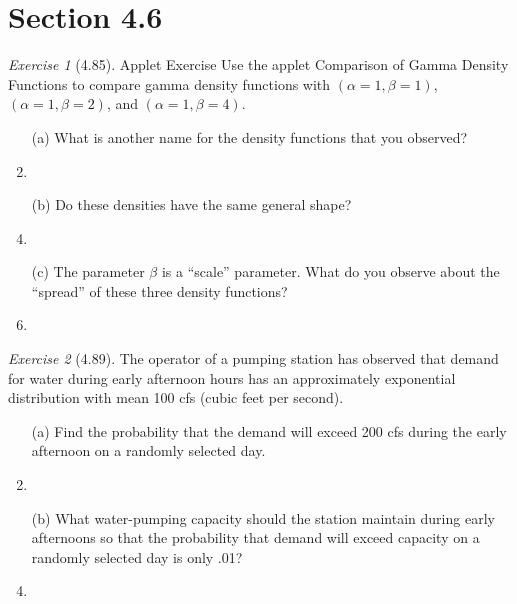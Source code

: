 \documentclass[12pt]{amsart}
\makeatletter
\theoremstyle{remark}
\newtheorem*{exercise}{Exercise}%
\renewenvironment{proof}[1][\proofname]{\par\doublespacing
  \pushQED{\qed}%
  \normalfont \topsep6\p@\@plus6\p@\relax
  \list{}{%
    \settowidth{\leftmargin}{\itshape\proofname:\hskip\labelsep}%
    \setlength{\labelwidth}{0pt}%
    \setlength{\itemindent}{-\leftmargin}%
  }%
  \item[\hskip\labelsep\itshape#1\@addpunct{:}]\ignorespaces
}{%
  \popQED\endlist\@endpefalse
  \singlespacing
}
\theoremstyle{mycomment}
\makeatother
\begin{document}
\section*{Section 4.6}
\begin{exercise}[4.85]
Applet Exercise Use the applet Comparison of Gamma Density Functions to compare gamma density functions with $(\alpha = 1, \beta = 1)$, $(\alpha = 1, \beta = 2)$, and $(\alpha = 1, \beta = 4)$.

\begin{enumerate}
    \item[(a)] What is another name for the density functions that you observed?
\begin{proof}[Solution]
 
\end{proof}
    \item[(b)] Do these densities have the same general shape?
\begin{proof}[Solution]
 
\end{proof}
    \item[(c)] The parameter $\beta$ is a ``scale'' parameter. What do you observe about the ``spread'' of these three density functions?
\begin{proof}[Solution]
 
\end{proof}
\end{enumerate}
\end{exercise}

\begin{exercise}[4.89]
The operator of a pumping station has observed that demand for water during early afternoon hours has an approximately exponential distribution with mean 100 cfs (cubic feet per second).

\begin{enumerate}
    \item[(a)] Find the probability that the demand will exceed 200 cfs during the early afternoon on a randomly selected day.
\begin{proof}[Solution]
 
\end{proof}
    \item[(b)] What water-pumping capacity should the station maintain during early afternoons so that the probability that demand will exceed capacity on a randomly selected day is only .01?
\begin{proof}[Solution]
 
\end{proof}
\end{enumerate}
\end{exercise}
\end{document}
